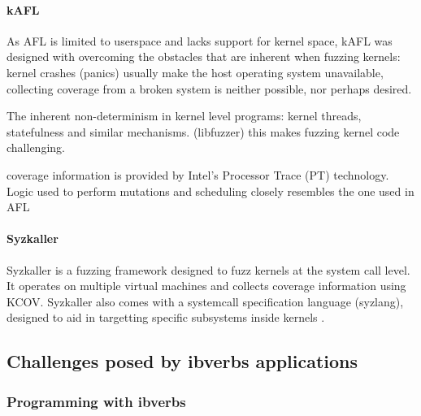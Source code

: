 \paragraph{kAFL}


As AFL is limited to userspace and lacks support for kernel space\cite{kafl}, kAFL was designed with overcoming
the obstacles that are inherent when fuzzing kernels: kernel crashes (panics) usually make the host operating system
unavailable, collecting coverage from a broken system is neither possible, nor perhaps desired.

The inherent non-determinism in kernel level programs: kernel threads, statefulness and similar mechanisms. (libfuzzer)
this makes fuzzing kernel code challenging.

coverage information is provided by Intel's Processor Trace (PT) technology. Logic used to perform
mutations and scheduling closely resembles the one used in AFL\cite{kafl}

\paragraph{Syzkaller}

Syzkaller is a fuzzing framework designed to fuzz kernels at the system call level. It operates on multiple
virtual machines and collects coverage information using KCOV. Syzkaller also comes with a systemcall specification
language (syzlang), designed to aid in targetting specific subsystems inside kernels \cite{syzkaller}.

\subsection{Challenges posed by ibverbs applications}

\subsubsection{Programming with ibverbs}





